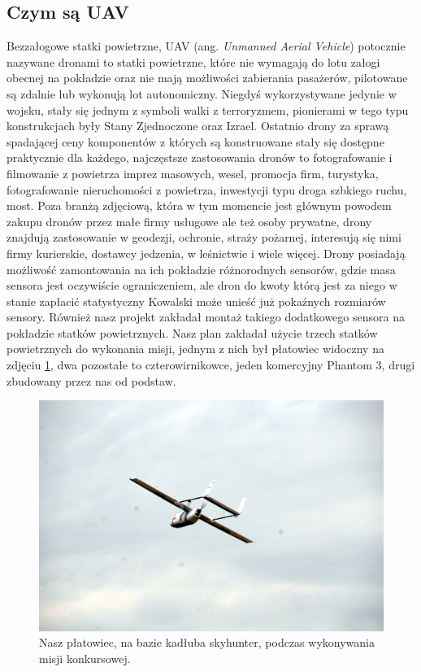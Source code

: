 \subsection{Czym są UAV}
Bezzałogowe statki powietrzne, UAV (ang. \textit{Unmanned Aerial Vehicle}) potocznie nazywane dronami to statki powietrzne, które nie wymagają do lotu załogi obecnej na pokładzie oraz nie mają możliwości zabierania pasażerów, pilotowane są zdalnie lub wykonują lot autonomiczny. Niegdyś wykorzystywane jedynie w wojsku, stały się jednym z symboli walki z terroryzmem, pionierami w tego typu konstrukcjach były Stany Zjednoczone oraz Izrael. Ostatnio drony za sprawą spadającej ceny komponentów z których są konstruowane stały się dostępne praktycznie dla każdego, najczęstsze zastosowania dronów to fotografowanie i filmowanie z powietrza imprez masowych, wesel, promocja firm, turystyka, fotografowanie nieruchomości z powietrza, inwestycji typu droga szbkiego ruchu, most. Poza branżą zdjęciową, która w tym momencie jest głównym powodem zakupu dronów przez małe firmy usługowe ale też osoby prywatne, drony znajdują zastosowanie w geodezji, ochronie, straży pożarnej, interesują się nimi firmy kurierskie, dostawcy jedzenia, w leśnictwie i wiele więcej. Drony posiadają możliwość zamontowania na ich pokładzie różnorodnych sensorów, gdzie masa sensora jest oczywiście ograniczeniem, ale dron do kwoty którą jest za niego w stanie zapłacić statystyczny Kowalski może unieść już pokaźnych rozmiarów sensory. Również nasz projekt zakładał montaż takiego dodatkowego sensora na pokładzie statków powietrznych. Nasz plan zakładał użycie trzech statków powietrznych do wykonania misji, jednym z nich był płatowiec widoczny na zdjęciu \ref{fig:skyhunter}, dwa pozostałe to czterowirnikowce, jeden komercyjny Phantom 3, drugi zbudowany przez nas od podstaw.

\begin{figure}[!th]
    \centering
    \includegraphics[width=15cm]{zalaczniki/obrazy/skyhunter.jpg}
    \caption{Nasz płatowiec, na bazie kadłuba skyhunter, podczas wykonywania misji konkursowej.}
    \label{fig:skyhunter}
\end{figure}

